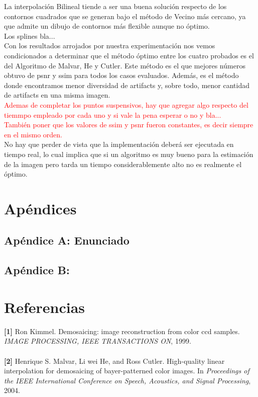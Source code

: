 \documentclass[a4paper]{article}
\begin{document}
La interpolaci\'on Bilineal tiende a ser una buena soluci\'on respecto de los contornos cuadrados que se generan bajo el m\'etodo de Vecino m\'as cercano, ya que admite un dibujo de contornos m\'as flexible aunque no \'optimo.\\

Los splines bla...\\

Con los resultados arrojados por nuestra experimentaci\'on nos vemos condicionados a determinar que el m\'etodo \'optimo entre los cuatro probados es el del Algoritmo de Malvar, He y Cutler. Este m\'etodo es el que mejores n\'umeros obtuvo de psnr y ssim para todos los casos evaluados. Adem\'as, es el m\'etodo donde encontramos menor diversidad de artifacts y, sobre todo, menor cantidad de artifacts en una misma imagen. \\

\textcolor{red}{Ademas de completar los puntos suspensivos, hay que agregar algo respecto del tiemmpo empleado por cada uno y si vale la pena esperar o no y bla...\\
Tambi\'en poner que los valores de ssim y psnr fueron constantes, es decir siempre en el mismo orden.}\\

No hay que perder de vista que la implementaci\'on deber\'a ser ejecutada en tiempo real, lo cual implica que si un algoritmo es muy bueno para la estimaci\'on de la imagen pero tarda un tiempo considerablemente alto no es realmente el \'optimo.




\section{Ap\'endices}
\subsection{Ap\'endice A: Enunciado} 


%

\subsection{Ap\'endice B:}
\newpage
\section{Referencias}
 
\textbf{[1]} Ron Kimmel. Demosaicing: image reconstruction from color ccd samples. \textit{IMAGE PROCESSING, IEEE TRANSACTIONS ON}, 1999. \\
\\

\textbf{[2]} Henrique S. Malvar, Li wei He, and Ross Cutler. High-quality linear interpolation for
demosaicing of bayer-patterned color images. In \textit{Proceedings of the IEEE International
Conference on Speech, Acoustics, and Signal Processing}, 2004.
\end{document}

